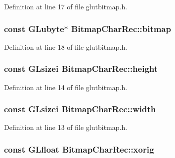 Definition at line 17 of file glutbitmap.\-h.

\hypertarget{struct_bitmap_char_rec_af9859692f6e3089f377788f458dd50bb}{
\subsubsection[{bitmap}]{\setlength{\rightskip}{0pt plus 5cm}const {\bf G\-Lubyte}$\ast$ Bitmap\-Char\-Rec\-::bitmap}}\label{struct_bitmap_char_rec_af9859692f6e3089f377788f458dd50bb}


Definition at line 18 of file glutbitmap.\-h.

\hypertarget{struct_bitmap_char_rec_a635c0cdf674896272c549c1ab3d82b21}{
\subsubsection[{height}]{\setlength{\rightskip}{0pt plus 5cm}const {\bf G\-Lsizei} Bitmap\-Char\-Rec\-::height}}\label{struct_bitmap_char_rec_a635c0cdf674896272c549c1ab3d82b21}


Definition at line 14 of file glutbitmap.\-h.

\hypertarget{struct_bitmap_char_rec_aec4f640649f028cbd750a29307587d45}{
\subsubsection[{width}]{\setlength{\rightskip}{0pt plus 5cm}const {\bf G\-Lsizei} Bitmap\-Char\-Rec\-::width}}\label{struct_bitmap_char_rec_aec4f640649f028cbd750a29307587d45}


Definition at line 13 of file glutbitmap.\-h.

\hypertarget{struct_bitmap_char_rec_a0349720d81a4c62afe6561201997e995}{
\subsubsection[{xorig}]{\setlength{\rightskip}{0pt plus 5cm}const {\bf G\-Lfloat} Bitmap\-Char\-Rec\-::xorig}}\label{struct_bitmap_char_rec_a0349720d81a4c62afe6561201997e995}


